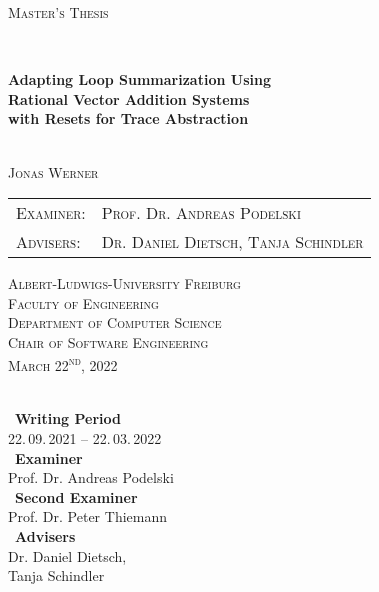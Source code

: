 \begin{titlepage}
	\begin{centering}
		
		{\scshape\Large Master's Thesis\par}
		
		
		\HorizontalLine \\[0.4cm]
		{\huge\bfseries Adapting Loop Summarization Using \\ Rational Vector Addition Systems \\ with Resets for Trace Abstraction \par}
		\HorizontalLine \\[1.5cm]
		
		
		{\Large \scshape Jonas Werner}\\[5cm]
		
		
		\begin{tabular}[scshape]{>{\normalsize}l >{\normalsize}l}
			\scshape Examiner: & \scshape Prof. Dr. Andreas Podelski\\[0.3cm]
			\scshape Advisers: & \scshape Dr. Daniel Dietsch, Tanja Schindler  \\[1.2cm]
		\end{tabular}
		\vfill  %
		
		\large { \scshape
			Albert-Ludwigs-University Freiburg\\
			Faculty of Engineering\\
			Department of Computer Science\\
			Chair of Software Engineering \\[1cm]
			
			March 22\textsuperscript{nd}, 2022\\
		}
	\end{centering}
\end{titlepage}

\thispagestyle{empty}
\ \vfill \ \\  %
\
\textbf{Writing Period}            \smallskip{} \\
22.\,09.\,2021 -- 22.\,03.\,2022   \bigskip{} \\
\
\textbf{Examiner}                  \smallskip{} \\
Prof. Dr. Andreas Podelski                     \bigskip{} \\
\
\textbf{Second Examiner}                  \smallskip{} \\
Prof. Dr. Peter Thiemann        \bigskip{} \\
\
\textbf{Advisers}                  \smallskip{} \\
Dr. Daniel Dietsch, \\ Tanja Schindler
\pagebreak
